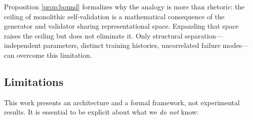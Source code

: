 \documentclass[11pt,a4paper]{article}
\theoremstyle{remark}
\begin{document}
Proposition \ref{prop:bound} formalizes why the analogy is more than rhetoric: the ceiling of monolithic self-validation is a mathematical consequence of the generator and validator sharing representational space. Expanding that space raises the ceiling but does not eliminate it. Only structural separation---independent parameters, distinct training histories, uncorrelated failure modes---can overcome this limitation.

\subsection{Limitations}

This work presents an architecture and a formal framework, not experimental results. It is essential to be explicit about what we \emph{do not} know:
\end{document}
